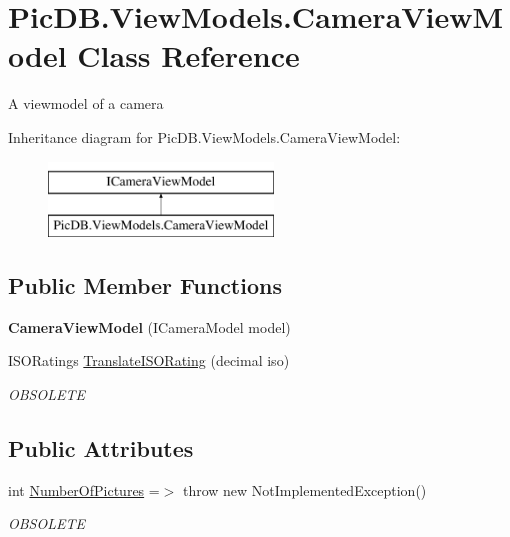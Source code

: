 \hypertarget{class_pic_d_b_1_1_view_models_1_1_camera_view_model}{}\section{Pic\+D\+B.\+View\+Models.\+Camera\+View\+Model Class Reference}
\label{class_pic_d_b_1_1_view_models_1_1_camera_view_model}


A viewmodel of a camera  


Inheritance diagram for Pic\+D\+B.\+View\+Models.\+Camera\+View\+Model\+:\begin{figure}[H]
\begin{center}
\leavevmode
\includegraphics[height=2.000000cm]{class_pic_d_b_1_1_view_models_1_1_camera_view_model}
\end{center}
\end{figure}
\subsection*{Public Member Functions}
\begin{DoxyCompactItemize}
\item 
\mbox{\label{class_pic_d_b_1_1_view_models_1_1_camera_view_model_a83b7d925f502fa3b732bf596175d9aa3}} 
{\bfseries Camera\+View\+Model} (I\+Camera\+Model model)
\item 
I\+S\+O\+Ratings \mbox{\hyperlink{class_pic_d_b_1_1_view_models_1_1_camera_view_model_a3e4639d271b4c240025e59b705de2a3e}{Translate\+I\+S\+O\+Rating}} (decimal iso)
\begin{DoxyCompactList}\small\item\em O\+B\+S\+O\+L\+E\+TE \end{DoxyCompactList}\end{DoxyCompactItemize}
\subsection*{Public Attributes}
\begin{DoxyCompactItemize}
\item 
int \mbox{\hyperlink{class_pic_d_b_1_1_view_models_1_1_camera_view_model_abc1f2929064a6db42c7d111be20a3cea}{Number\+Of\+Pictures}} =$>$ throw new Not\+Implemented\+Exception()
\begin{DoxyCompactList}\small\item\em O\+B\+S\+O\+L\+E\+TE \end{DoxyCompactList}\end{DoxyCompactItemize}
